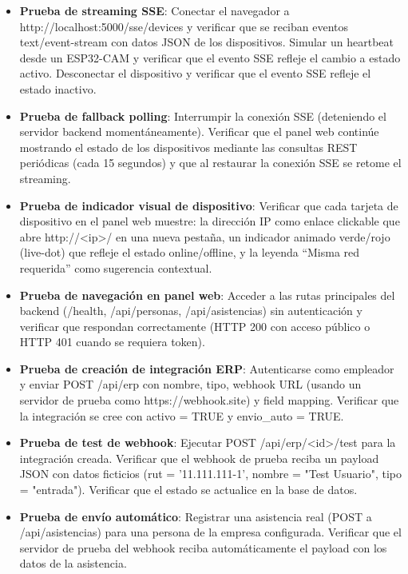 \begin{itemize}
    \item \textbf{Prueba de streaming SSE}: Conectar el navegador a http://localhost:5000/sse/devices y verificar que se reciban eventos text/event-stream con datos JSON de los dispositivos. Simular un heartbeat desde un ESP32-CAM y verificar que el evento SSE refleje el cambio a estado activo. Desconectar el dispositivo y verificar que el evento SSE refleje el estado inactivo.

    \item \textbf{Prueba de fallback polling}: Interrumpir la conexión SSE (deteniendo el servidor backend momentáneamente). Verificar que el panel web continúe mostrando el estado de los dispositivos mediante las consultas REST periódicas (cada 15 segundos) y que al restaurar la conexión SSE se retome el streaming.

    \item \textbf{Prueba de indicador visual de dispositivo}: Verificar que cada tarjeta de dispositivo en el panel web muestre: la dirección IP como enlace clickable que abre http://<ip>/ en una nueva pestaña, un indicador animado verde/rojo (live-dot) que refleje el estado online/offline, y la leyenda ``Misma red requerida'' como sugerencia contextual.

    \item \textbf{Prueba de navegación en panel web}: Acceder a las rutas principales del backend (/health, /api/personas, /api/asistencias) sin autenticación y verificar que respondan correctamente (HTTP 200 con acceso público o HTTP 401 cuando se requiera token).

    \item \textbf{Prueba de creación de integración ERP}: Autenticarse como empleador y enviar POST /api/erp con nombre, tipo, webhook URL (usando un servidor de prueba como https://webhook.site) y field mapping. Verificar que la integración se cree con activo = TRUE y envio\_auto = TRUE.

    \item \textbf{Prueba de test de webhook}: Ejecutar POST /api/erp/<id>/test para la integración creada. Verificar que el webhook de prueba reciba un payload JSON con datos ficticios (rut = '11.111.111-1', nombre = "Test Usuario", tipo = "entrada"). Verificar que el estado se actualice en la base de datos.

    \item \textbf{Prueba de envío automático}: Registrar una asistencia real (POST a /api/asistencias) para una persona de la empresa configurada. Verificar que el servidor de prueba del webhook reciba automáticamente el payload con los datos de la asistencia.


\end{itemize}
